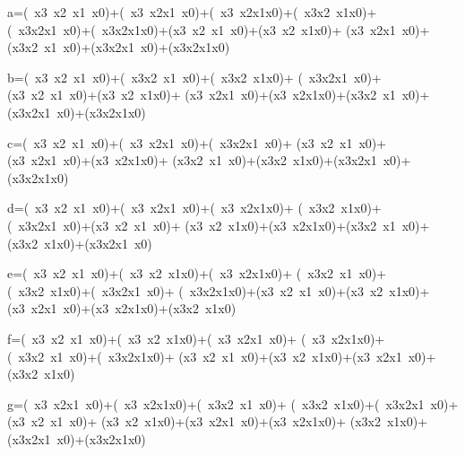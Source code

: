 a=(~x3~x2~x1~x0)+(~x3~x2x1~x0)+(~x3~x2x1x0)+(~x3x2~x1x0)+
(~x3x2x1~x0)+(~x3x2x1x0)+(x3~x2~x1~x0)+(x3~x2~x1x0)+
(x3~x2x1~x0)+(x3x2~x1~x0)+(x3x2x1~x0)+(x3x2x1x0)

b=(~x3~x2~x1~x0)+(~x3x2~x1~x0)+(~x3x2~x1x0)+
(~x3x2x1~x0)+(x3~x2~x1~x0)+(x3~x2~x1x0)+
(x3~x2x1~x0)+(x3~x2x1x0)+(x3x2~x1~x0)+
(x3x2x1~x0)+(x3x2x1x0)

c=(~x3~x2~x1~x0)+(~x3~x2x1~x0)+(~x3x2x1~x0)+
(x3~x2~x1~x0)+(x3~x2x1~x0)+(x3~x2x1x0)+
(x3x2~x1~x0)+(x3x2~x1x0)+(x3x2x1~x0)+(x3x2x1x0)

d=(~x3~x2~x1~x0)+(~x3~x2x1~x0)+(~x3~x2x1x0)+
(~x3x2~x1x0)+(~x3x2x1~x0)+(x3~x2~x1~x0)+
(x3~x2~x1x0)+(x3~x2x1x0)+(x3x2~x1~x0)+
(x3x2~x1x0)+(x3x2x1~x0)

e=(~x3~x2~x1~x0)+(~x3~x2~x1x0)+(~x3~x2x1x0)+
(~x3x2~x1~x0)+(~x3x2~x1x0)+(~x3x2x1~x0)+
(~x3x2x1x0)+(x3~x2~x1~x0)+(x3~x2~x1x0)+
(x3~x2x1~x0)+(x3~x2x1x0)+(x3x2~x1x0)

f=(~x3~x2~x1~x0)+(~x3~x2~x1x0)+(~x3~x2x1~x0)+
(~x3~x2x1x0)+(~x3x2~x1~x0)+(~x3x2x1x0)+
(x3~x2~x1~x0)+(x3~x2~x1x0)+(x3~x2x1~x0)+(x3x2~x1x0)

g=(~x3~x2x1~x0)+(~x3~x2x1x0)+(~x3x2~x1~x0)+
(~x3x2~x1x0)+(~x3x2x1~x0)+(x3~x2~x1~x0)+
(x3~x2~x1x0)+(x3~x2x1~x0)+(x3~x2x1x0)+
(x3x2~x1x0)+(x3x2x1~x0)+(x3x2x1x0)